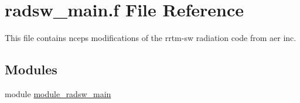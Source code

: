 \hypertarget{radsw__main_8f}{}\section{radsw\+\_\+main.\+f File Reference}
\label{radsw__main_8f}


This file contains ncep\textquotesingle{}s modifications of the rrtm-\/sw radiation code from aer inc.  


\subsection*{Modules}
\begin{DoxyCompactItemize}
\item 
module \hyperlink{namespacemodule__radsw__main}{module\+\_\+radsw\+\_\+main}
\end{DoxyCompactItemize}
